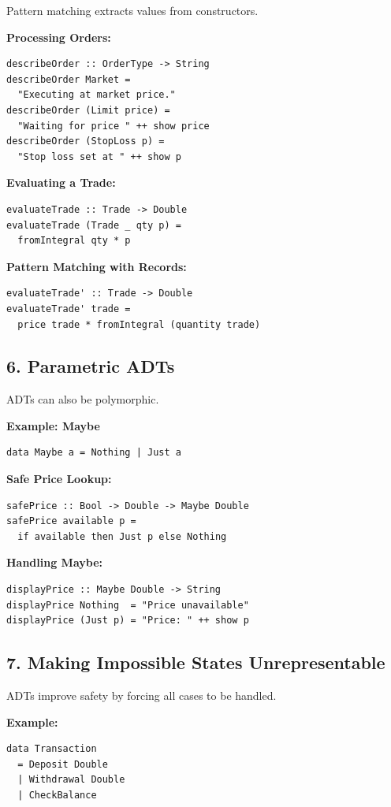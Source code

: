 \documentclass[12pt]{article}
\begin{document}
Pattern matching extracts values from constructors.

\textbf{Processing Orders:}
\begin{verbatim}
describeOrder :: OrderType -> String
describeOrder Market =
  "Executing at market price."
describeOrder (Limit price) =
  "Waiting for price " ++ show price
describeOrder (StopLoss p) =
  "Stop loss set at " ++ show p
\end{verbatim}

\textbf{Evaluating a Trade:}
\begin{verbatim}
evaluateTrade :: Trade -> Double
evaluateTrade (Trade _ qty p) =
  fromIntegral qty * p
\end{verbatim}

\textbf{Pattern Matching with Records:}
\begin{verbatim}
evaluateTrade' :: Trade -> Double
evaluateTrade' trade =
  price trade * fromIntegral (quantity trade)
\end{verbatim}

\subsection{6. Parametric ADTs}

ADTs can also be polymorphic.

\textbf{Example: Maybe}
\begin{verbatim}
data Maybe a = Nothing | Just a
\end{verbatim}

\textbf{Safe Price Lookup:}
\begin{verbatim}
safePrice :: Bool -> Double -> Maybe Double
safePrice available p =
  if available then Just p else Nothing
\end{verbatim}

\textbf{Handling Maybe:}
\begin{verbatim}
displayPrice :: Maybe Double -> String
displayPrice Nothing  = "Price unavailable"
displayPrice (Just p) = "Price: " ++ show p
\end{verbatim}

\subsection{7. Making Impossible States Unrepresentable}

ADTs improve safety by forcing all cases to be handled.

\textbf{Example:}
\begin{verbatim}
data Transaction
  = Deposit Double
  | Withdrawal Double
  | CheckBalance
\end{verbatim}
\end{document}
